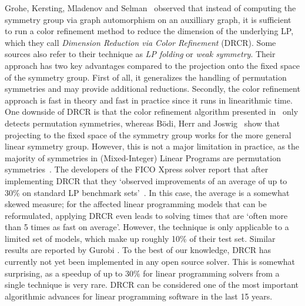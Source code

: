 \documentclass[pdflatex,sn-mathphys-num]{sn-jnl}%
\theoremstyle{thmstyleone}%
\theoremstyle{thmstylethree}%
\theoremstyle{thmstyletwo}%
\begin{document}
Grohe, Kersting, Mladenov and Selman~\cite{Grohe2014} observed that instead of computing the symmetry group via graph automorphism on an auxilliary graph, it is sufficient to run a color refinement method to reduce the dimension of the underlying LP, which they call \emph{Dimension Reduction via Color Refinement} (DRCR). Some sources also refer to their technique as \emph{LP folding} or \emph{weak symmetry}. Their approach has two key advantages compared to the projection onto the fixed space of the symmetry group. First of all, it generalizes the handling of permutation symmetries and may provide additional reductions. Secondly, the color refinement approach is fast in theory and fast in practice since it runs in linearithmic time. One downside of DRCR is that the color refinement algorithm presented in~\cite{Grohe2014} only detects permutation symmetries, whereas B{\"o}di, Herr and Joswig~\cite{Bodi2013} show that projecting to the fixed space of the symmetry group works for the more general linear symmetry group. However, this is not a major limitation in practice, as the majority of symmetries in (Mixed-Integer) Linear Programs are permutation symmetries~\cite{Hojny2025-si}. The developers of the FICO Xpress solver report that after implementing DRCR that they  `observed improvements of an average of up to 30\% on standard LP benchmark sets'~\cite{Berthold2018}. In this case, the average is a somewhat skewed measure; for the affected linear programming models that can be reformulated, applying DRCR even leads to solving times that are `often more than 5 times as fast on average'. However, the technique is only applicable to a limited set of models, which make up roughly 10\% of their test set. 
Similar results are reported by Gurobi \cite{GurobiOptimization2020}. 
To the best of our knowledge, DRCR has currently not yet been implemented in any open source solver. This is somewhat surprising, as a speedup of up to 30\% for linear programming solvers from a single technique is very rare. DRCR can be considered one of the most important algorithmic advances for linear programming software in the last 15 years.\\
\end{document}
